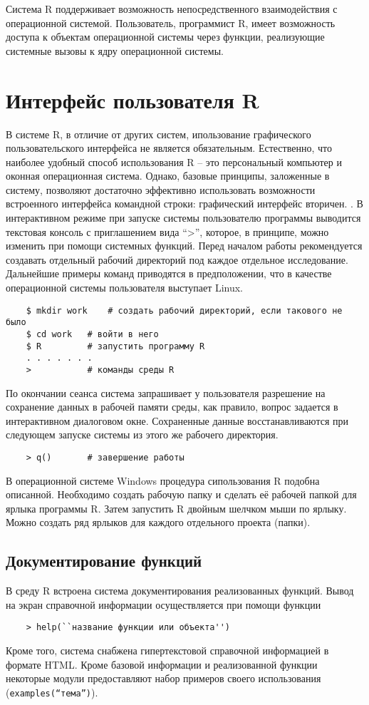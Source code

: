 \documentclass[12pt, openany, twoside]{book} %
\begin{document}
Система R поддерживает возможность непосредственного взаимодействия с операционной системой. Пользователь, программист R, имеет возможность доступа к объектам операционной системы через функции, реализующие системные вызовы к ядру операционной системы. 

\section{Интерфейс пользователя R}
В системе R, в отличие от других систем, ипользование графического пользовательского интерфейса не является обязательным. Естественно, что наиболее удобный способ использования R – это персональный компьютер и оконная операционная система. Однако, базовые принципы, заложенные в систему, позволяют достаточно эффективно использовать возможности встроенного интерфейса командной строки: графический интерфейс вторичен.
.
В интерактивном режиме при запуске системы пользователю программы  выводится текстовая консоль с приглашением вида ``>'', которое, в принципе, можно изменить при помощи системных функций. Перед началом работы рекомендуется создавать отдельный рабочий директорий под каждое отдельное исследование. Дальнейшие примеры команд приводятся в предположении, что в качестве операционной системы пользователя выступает Linux.
{\tt\begin{verbatim}
	$ mkdir work 	# создать рабочий директорий, если такового не было
	$ cd work	# войти в него
	$ R			# запустить программу R
	. . . . . . . 
	> 	 		# команды среды R
\end{verbatim}}
По окончании сеанса система запрашивает у пользователя разрешение на сохранение данных в рабочей памяти среды, как правило, вопрос задается в интерактивном диалоговом окне. Сохраненные данные восстанавливаются при следующем запуске системы из этого же рабочего директория.
{\tt\begin{verbatim}
	> q() 		# завершение работы
\end{verbatim}}

В операционной системе Windows процедура сипользования R подобна описанной. Необходимо создать рабочую папку и сделать её рабочей папкой для ярлыка программы R. Затем  запустить R двойным шелчком мыши по ярлыку. Можно создать ряд ярлыков для каждого отдельного проекта (папки).

\subsection{Документирование функций}
В среду R встроена система документирования реализованных функций. Вывод на экран справочной информации осуществляется при помощи функции 
{\tt\begin{verbatim}
	> help(``название функции или объекта'')
\end{verbatim}}
Кроме того, система снабжена гипертекстовой справочной информацией в формате HTML. 
Кроме базовой информации и реализованной функции некоторые модули предоставляют набор примеров своего использования (\texttt{examples(``тема'')}).
\end{document}
